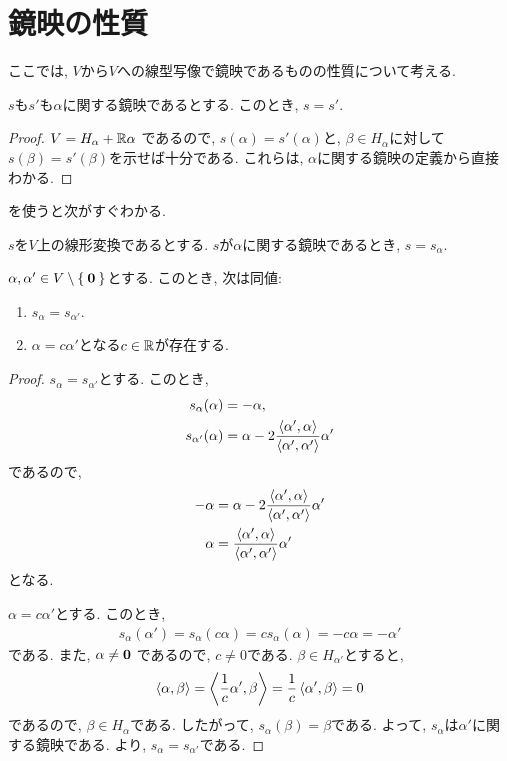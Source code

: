 \section{鏡映の性質}
ここでは, $V$から$V$への線型写像で鏡映であるものの性質について考える.
\begin{lemma}
  \label{lemma:reflisunique}
  $s$も$s'$も$\alpha$に関する鏡映であるとする.
  このとき, $s=s'$.
\end{lemma}
\begin{proof}
  $V =   H_\alpha +  \mathbb{R}\alpha$
  であるので,
  $s(\alpha)=s'(\alpha)$と,
  $\beta\in H_\alpha$に対して
  $s(\beta)=s'(\beta)$を示せば十分である.
  これらは,
  $\alpha$に関する鏡映の定義から直接わかる.
\end{proof}
を使うと次がすぐわかる.
\begin{prop}
  $s$を$V$上の線形変換であるとする.
  $s$が$\alpha$に関する鏡映であるとき, $s=s_\alpha$.
\end{prop}

\begin{prop}
  $\alpha, \alpha' \in V\setminus\Set{\boldsymbol{0}}$とする.
  このとき, 次は同値:
  \begin{enumerate}
  \item $s_\alpha=s_{\alpha'}$.
  \item $\alpha=c\alpha'$となる$c\in \mathbb{R}$が存在する.
  \end{enumerate}
\end{prop}
\begin{proof}
  $s_\alpha=s_{\alpha'}$とする.
  このとき,
  \begin{align*}
    s_\alpha(\alpha) &=-\alpha,\\
    s_{\alpha'} (\alpha) &= \alpha - 2\frac{\Braket{\alpha',\alpha}}{\Braket{\alpha',\alpha'}}\alpha'
  \end{align*}
  であるので,
  \begin{align*}
    -\alpha &= \alpha - 2\frac{\Braket{\alpha',\alpha}}{\Braket{\alpha',\alpha'}}\alpha'\\
    \alpha &= \frac{\Braket{\alpha',\alpha}}{\Braket{\alpha',\alpha'}}\alpha'
  \end{align*}
  となる.

  $\alpha=c\alpha'$とする.
  このとき,
  \begin{align*}
    s_{\alpha}(\alpha')=s_{\alpha}(c\alpha)=cs_{\alpha}(\alpha)=-c\alpha=-\alpha'
  \end{align*}
  である.
  また,
  $\alpha\neq \boldsymbol{0}$
  であるので, $c\neq 0$である.
  $\beta \in H_{\alpha'}$とすると,
  \begin{align*}
    \Braket{\alpha,\beta}=\Braket{\frac{1}{c}\alpha',\beta}=\frac{1}{c}\Braket{\alpha',\beta}=0
  \end{align*}
  であるので, $\beta \in H_\alpha$である.
  したがって,
  $s_\alpha(\beta)=\beta$である.
  よって, $s_\alpha$は$\alpha'$に関する鏡映である.
  より, $s_\alpha=s_{\alpha'}$である.
\end{proof}


